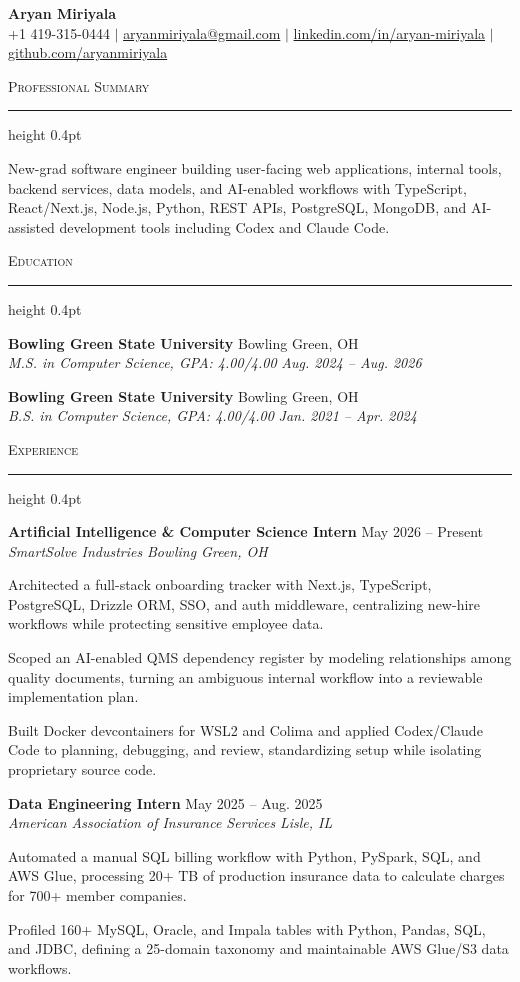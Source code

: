 \documentclass[letterpaper,11pt]{article}
\newcommand{\resumesection}[1]{%
  \par\vspace{2pt}%
  {\large\scshape #1}\par\vspace{2pt}%
  \hrule height 0.4pt\vspace{2pt}%
}
\newcommand{\resumeSubheading}[4]{
  \textbf{#1} \hfill #2\\
  \textit{#3} \hfill \textit{#4}
}
\begin{document}
\begin{center}
  {\LARGE \textbf{Aryan Miriyala}}\\[-1pt]
  \small
  +1 419-315-0444 $|$
  \href{mailto:aryanmiriyala@gmail.com}{aryanmiriyala@gmail.com} $|$
  \href{https://www.linkedin.com/in/aryan-miriyala-7788a21b6/}{linkedin.com/in/aryan-miriyala} $|$
  \href{https://github.com/aryanmiriyala}{github.com/aryanmiriyala}
\end{center}\vspace{-10pt}

\resumesection{Professional Summary}
New-grad software engineer building user-facing web applications, internal tools, backend services, data models, and AI-enabled workflows with TypeScript, React/Next.js, Node.js, Python, REST APIs, PostgreSQL, MongoDB, and AI-assisted development tools including Codex and Claude Code.

\resumesection{Education}
\resumeSubheading
{Bowling Green State University}{Bowling Green, OH}
{M.S. in Computer Science, GPA: 4.00/4.00}{Aug. 2024 -- Aug. 2026}

\resumeSubheading
{Bowling Green State University}{Bowling Green, OH}
{B.S. in Computer Science, GPA: 4.00/4.00}{Jan. 2021 -- Apr. 2024}

\resumesection{Experience}
\resumeSubheading
{Artificial Intelligence \& Computer Science Intern}{May 2026 -- Present}
{SmartSolve Industries}{Bowling Green, OH}
\begin{tightitemize}
  \item Architected a full-stack onboarding tracker with Next.js, TypeScript, PostgreSQL, Drizzle ORM, SSO, and auth middleware, centralizing new-hire workflows while protecting sensitive employee data.
  \item Scoped an AI-enabled QMS dependency register by modeling relationships among quality documents, turning an ambiguous internal workflow into a reviewable implementation plan.
  \item Built Docker devcontainers for WSL2 and Colima and applied Codex/Claude Code to planning, debugging, and review, standardizing setup while isolating proprietary source code.
\end{tightitemize}

\resumeSubheading
{Data Engineering Intern}{May 2025 -- Aug. 2025}
{American Association of Insurance Services}{Lisle, IL}
\begin{tightitemize}
  \item Automated a manual SQL billing workflow with Python, PySpark, SQL, and AWS Glue, processing 20+ TB of production insurance data to calculate charges for 700+ member companies.
  \item Profiled 160+ MySQL, Oracle, and Impala tables with Python, Pandas, SQL, and JDBC, defining a 25-domain taxonomy and maintainable AWS Glue/S3 data workflows.
\end{tightitemize}
\end{document}
